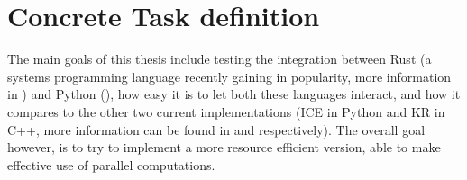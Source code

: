 % 
% 
% 
% 
% 
% 



\section{Concrete Task definition}

The main goals of this thesis include testing the integration between Rust (a
systems programming language recently gaining in popularity, more information
in ) and Python (), how easy it is to
let both these languages interact, and how it compares to the other two current
implementations (ICE in Python and KR in C++, more information can be found in
 and  respectively). The overall goal
however, is to try to implement a more resource efficient version, able to make
effective use of parallel computations.



